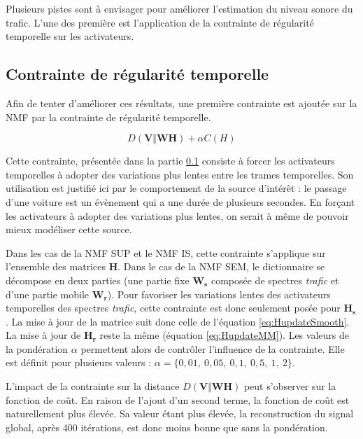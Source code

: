 Plusieurs pistes sont à envisager pour améliorer l'estimation du niveau sonore du trafic. L'une des première est l'application de la contrainte de régularité temporelle sur les activateurs.

\subsection{Contrainte de régularité temporelle}
Afin de tenter d'améliorer ces résultats, une première contrainte est ajoutée sur la NMF par la contrainte de régularité temporelle. 

\begin{equation}
D(\mathbf{V}\Vert \mathbf{WH}) + \alpha C(H)
\end{equation}

Cette contrainte, présentée dans la partie \ref{} consiste à forcer les activateurs temporelles à adopter des variations plus lentes entre les trames temporelles. Son utilisation est justifié ici par le comportement de la source d'intérêt : le passage d'une voiture est un évènement qui a une durée de plusieurs secondes. En forçant les activateurs à adopter des variations plus lentes, on serait à même de pouvoir mieux modéliser cette source. 

Dans les cas de la NMF SUP et le NMF IS, cette contrainte s'applique sur l'ensemble des matrices $\mathbf{H}$. Dans le cas de la NMF SEM, le dictionnaire se décompose en deux parties (une partie fixe $\mathbf{W_s}$ composée de spectres \textit{trafic} et d'une partie mobile $\mathbf{W_r}$). Pour favoriser les variations lentes des activateurs temporelles des spectres \textit{trafic}, cette contrainte est donc seulement posée pour $\mathbf{H_s}$. La mise à jour de la matrice suit donc celle de l'équation \ref{eq:HupdateSmooth}. La mise à jour de $\mathbf{H_r}$ reste la même (équation \ref{eq:HupdateMM}).
Les valeurs de la pondération $\alpha$ permettent alors de contrôler l'influence de la contrainte. Elle est définit pour plusieurs valeurs : $\alpha = \lbrace 0,01,~ 0,05,~ 0,1,~ 0,5,~ 1,~2 \rbrace$.

L'impact de la contrainte sur la distance $D(\mathbf{V}\Vert \mathbf{WH})$ peut s'observer sur la fonction de coût. En raison de l'ajout d'un second terme, la fonction de coût est naturellement plus élevée. Sa valeur étant plus élevée, la reconstruction du signal global, après 400 itérations, est donc moins bonne que sans la pondération.
 
